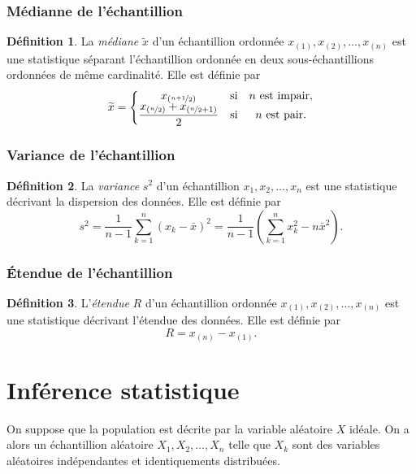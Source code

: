 \documentclass[11pt]{article}
\makeatletter
\theoremstyle{remark}
\theoremstyle{definition}
\newtheorem*{@definition}{Définition}
\newenvironment{definition}{%
	\begin{@definition}%
}{%
	\end{@definition}%
	\setcounter{property}{0}%
}
\makeatother
\begin{document}
\subsubsection{Médianne de l'échantillion}
\begin{definition}
	La \textit{médiane} $\widetilde{x}$ d'un échantillion ordonnée $x_{(1)},
	x_{(2)},\dots,x_{(n)}$ est une statistique séparant l'échantillion
	ordonnée en deux sous-échantillions ordonnées de même cardinalité. Elle 
	est définie par
	\begin{equation*}
		\widetilde{x}=\left\{
			\begin{matrix}
				x_{(\nicefrac{n+1}{2})} & \text{si} & \text{$n$ est impair},\\
				\dfrac{
					x_{(\nicefrac{n}{2})}+
					x_{(\nicefrac{n}{2}+1)}
				}{2} & \text{si} & \text{$n$ est pair}.\\
			\end{matrix}
		\right.
	\end{equation*}
\end{definition}

\subsubsection{Variance de l'échantillion}
\begin{definition}
	La \textit{variance} $s^2$ d'un échantillion $x_1,x_2,\dots,x_n$ est une
	statistique décrivant la dispersion des données. Elle est définie par
	\begin{equation*}
		s^2
		=\frac{1}{n-1}\sum_{k=1}^n\left(x_k-\bar{x}\right)^2
		=\frac{1}{n-1}\left(\sum_{k=1}^nx_k^2-n\bar{x}^2\right).
	\end{equation*}
\end{definition}

\subsubsection{Étendue de l'échantillion}
\begin{definition}
	L'\textit{étendue} $R$ d'un échantillion ordonnée $x_{(1)},x_{(2)},\dots,
	x_{(n)}$ est une statistique décrivant l'étendue des données. Elle est
	définie par
	\begin{equation*}
		R=x_{(n)}-x_{(1)}.
	\end{equation*}
\end{definition}

\pagebreak
\section{Inférence statistique}
On suppose que la population est décrite par la variable aléatoire $X$ idéale.
On a alors un échantillion aléatoire $X_1,X_2,\dots,X_n$ telle que $X_k$ sont
des variables aléatoires indépendantes et identiquements distribuées.
\end{document}
